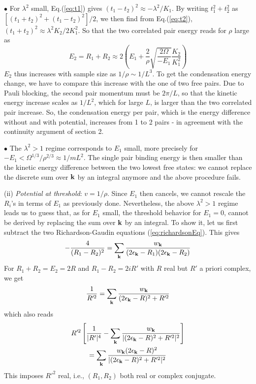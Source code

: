 \documentclass[5p,twocolumn]{elsarticle}
\begin{document}
$\bullet$ For $\lambda^{2}$ small, Eq.(\ref{eq:t1}) gives $(t_{1}-t_{2})^{2}\approx-\lambda^{2}/K_{1}$. By writing $t_{1}^{2}+t_{2}^{2}$ as $\left[(t_{1}+t_{2})^{2}+(t_{1}-t_{2})^{2}\right]/2$, we then find from Eq.(\ref{eq:t2}), $(t_{1}+t_{2})^{2}\approx\lambda^{2}K_{2}/2K_{1}^{2}$.  So that the two correlated pair energy  reads for $\rho$ large as 
\begin{equation}
E_{2}=R_{1}+R_{2}\approx2\left(E_{1}+\frac{2}{\rho}\sqrt{\frac{2\Omega}{-E_{1}}}\frac{K_{2}}{K_{1}^{2}}\right)
\end{equation}
$E_{2}$ thus increases with sample size as $1/\rho\sim1/L^{3}$.
To get the condensation energy change, we have to compare this increase with the one of two free pairs.  Due to Pauli blocking, the second pair momentum must be $2\pi/L$, so that the kinetic energy increase scales as $1/L^{2}$, which for large $L$, is larger than the two correlated pair increase. 
So, the condensation energy per pair, which is the energy difference without and with potential, increases from 1 to 2 pairs - in agreement with the continuity argument of section 2. 

 $\bullet$ The $\lambda^{2}>1$ regime corresponds to $E_{1}$ small, more precisely for $-E_{1}<\Omega^{1/3}/\rho^{2/3}\approx1/mL^{2}$.  The single pair binding energy is then smaller than the kinetic energy difference between the two lowest free states: we cannot replace the discrete sum over $\mathbf{k}$ by an integral anymore and the above procedure fails.  


(ii) {\it Potential at threshold}: $v=1/\rho$. Since $E_1$ then cancels, we cannot rescale the $R_i$'s in terms of $E_1$ as previously done. Nevertheless, the above $\lambda^{2}>1$ regime leads us to guess that, as for $E_1$ small, the threshold behavior for $E_1=0$, cannot be derived by replacing the sum over $\mathbf{k}$ by an integral.
To show it, let us first subtract the two Richardson-Gaudin equations (\ref{eq:richardsonEq}). This gives
\begin{equation}
-\frac{4}{(R_1-R_2)^2}=\sum_{\mathbf{k}}\frac{w_{\mathbf{k}}}{(2\epsilon_{\mathbf{k}}-R_1)(2\epsilon_{\mathbf{k}}-R_2)}\label{eq:2PairMinus}
\end{equation}
For $R_1+R_2=E_2=2R$ and $R_1-R_2=2iR'$ with $R$ real but $R'$ a priori complex, we get
\begin{equation}
\frac{1}{R'^2}=\sum_{\mathbf{k}}\frac{w_{\mathbf{k}}}{(2\epsilon_{\mathbf{k}}-R)^2+R'^2}
\end{equation}
which also reads 
\begin{multline}
R'^{2}\left[\frac{1}{|R'|^{4}}-\sum_{\mathbf{k}}\frac{w_{\mathbf{k}}}{|(2\epsilon_{\mathbf{k}}-R)^{2}+R'^{2}|^{2}}\right]\\
=\sum_{\mathbf{k}}\frac{w_{\mathbf{k}}(2\epsilon_{\mathbf{k}}-R)^{2}}{|(2\epsilon_{\mathbf{k}}-R)^{2}+R'^{2}|^{2}}
\end{multline}
This imposes $R'^2$ real, i.e., $(R_1,R_2)$ both real or complex conjugate.
\end{document}
